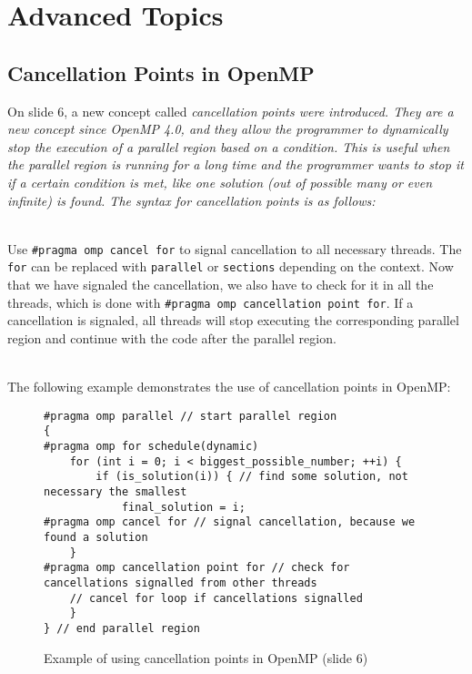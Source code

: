 \documentclass[../../main.tex]{subfiles}
\begin{document}
\section{Advanced Topics}
\subsection{Cancellation Points in OpenMP}
On slide 6, a new concept called \em cancellation points \em were introduced. They are a new concept since OpenMP 4.0, and they allow the programmer to dynamically stop the execution of a parallel region based on a condition. This is useful when the parallel region is running for a long time and the programmer wants to stop it if a certain condition is met, like one solution (out of possible many or even infinite) is found. The syntax for cancellation points is as follows:

~\\
Use \texttt{\#pragma omp cancel for} to signal cancellation to all necessary threads. The \texttt{for} can be replaced with \texttt{parallel} or \texttt{sections} depending on the context. Now that we have signaled the cancellation, we also have to check for it in all the threads, which is done with \texttt{\#pragma omp cancellation point for}. If a cancellation is signaled, all threads will stop executing the corresponding parallel region and continue with the code after the parallel region.

~\\
The following example demonstrates the use of cancellation points in OpenMP:

\begin{figure}[h]
    \begin{lstlisting}
#pragma omp parallel // start parallel region
{
#pragma omp for schedule(dynamic)
    for (int i = 0; i < biggest_possible_number; ++i) {
        if (is_solution(i)) { // find some solution, not necessary the smallest
            final_solution = i;
#pragma omp cancel for // signal cancellation, because we found a solution
    }
#pragma omp cancellation point for // check for cancellations signalled from other threads
    // cancel for loop if cancellations signalled
    }
} // end parallel region
    \end{lstlisting}
    \caption{Example of using cancellation points in OpenMP (slide 6)}
\end{figure}
\end{document}
